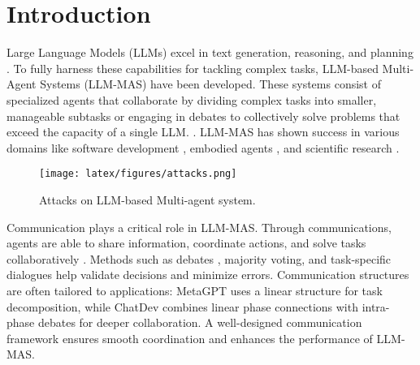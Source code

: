 
\section{Introduction}



Large Language Models (LLMs) excel in text generation, reasoning, and planning \citep{zhao2023survey,wei2022chain,song2023llm, brown2020language}. To fully harness these capabilities for tackling complex tasks, LLM-based Multi-Agent Systems (LLM-MAS) have been developed. These systems consist of specialized agents that collaborate by dividing complex tasks into smaller, manageable subtasks or engaging in debates to collectively solve problems that exceed the capacity of a single LLM.
\citep{guo2024large, wu2023autogen, talebirad2023multi}. LLM-MAS has shown success in various domains like software development \citep{liu2024large, hong2023metagpt, qian2024chatdev}, embodied agents \citep{guo2024embodied, song2023llm}, and scientific research \citep{zheng2023chatgpt, tang2023medagents}.
\begin{figure}[t]
    \centering
    \texttt{[image: latex/figures/attacks.png]}
    \caption{Attacks on LLM-based Multi-agent system.}
    \label{fig:attacks}
\end{figure}

Communication plays a critical role in LLM-MAS.
Through communications, agents are able to share information, coordinate actions, and solve tasks collaboratively \citep{qian2024scaling}. Methods such as debates \citep{du2023improving}, majority voting\citep{zhao2024electoral}, and task-specific dialogues \citep{hong2023metagpt} help validate decisions and minimize errors. Communication structures are often tailored to applications: MetaGPT \citep{hong2023metagpt} uses a linear structure for task decomposition, while ChatDev \citep{qian2024chatdev} combines linear phase connections with intra-phase debates for deeper collaboration. 
A well-designed communication framework ensures smooth coordination and enhances the performance of LLM-MAS.


